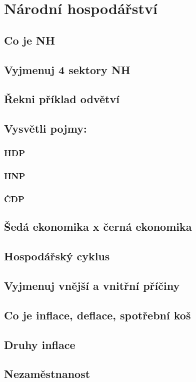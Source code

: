 \documentclass[ekobook.tex]{subfiles}
\begin{document}
\section{Národní hospodářství}
\subsection{Co je NH}
\subsection{Vyjmenuj 4 sektory NH}
\subsection{Řekni příklad odvětví}
\subsection{Vysvětli pojmy:}
\subsubsection{HDP}
\subsubsection{HNP}
\subsubsection{ČDP}
\subsection{Šedá ekonomika x černá ekonomika}
\subsection{Hospodářský cyklus}
\subsection{Vyjmenuj vnější a vnitřní příčiny}
\subsection{Co je inflace, deflace, spotřební koš}
\subsection{Druhy inflace}
\subsection{Nezaměstnanost}
\end{document}
